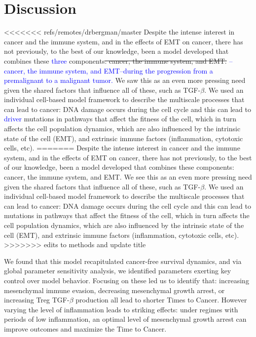 \documentclass[11pt]{article}
\newcommand{\tcb} { \textcolor{blue} }
\begin{document}
\section{Discussion}\label{Discussion}
<<<<<<< refs/remotes/drbergman/master
Despite the intense interest in cancer and the immune system, and in the effects of EMT on cancer, there has not previously, to the best of our knowledge, been a model developed that combines these \tcb{three} components\sout{: cancer, the immune system, and EMT.} \tcb{--cancer, the immune system, and EMT--during the progression from a premalignant to a malignant tumor.} We saw this as an even more pressing need given the shared factors that influence all of these, such as TGF-$\beta$. We used an individual cell-based model framework to describe the multiscale processes that can lead to cancer: DNA damage occurs during the cell cycle and this can lead to \tcb{driver} mutations in pathways that affect the fitness of the cell, which in turn affects the cell population dynamics, which are also influenced by the intrinsic state of the cell (EMT), and extrinsic immune factors (inflammation, cytotoxic cells, etc).
=======
Despite the intense interest in cancer and the immune system, and in the effects of EMT on cancer, there has not previously, to the best of our knowledge, been a model developed that combines these components: cancer, the immune system, and EMT. We see this as an even more pressing need given the shared factors that influence all of these, such as TGF-$\beta$. We used an individual cell-based model framework to describe the multiscale processes that can lead to cancer: DNA damage occurs during the cell cycle and this can lead to mutations in pathways that affect the fitness of the cell, which in turn affects the cell population dynamics, which are also influenced by the intrinsic state of the cell (EMT), and extrinsic immune factors (inflammation, cytotoxic cells, etc).
>>>>>>> edits to methods and update title
\par
We found that this model recapitulated cancer-free survival dynamics, and via global parameter sensitivity analysis, we identified parameters exerting key control over model behavior. Focusing on these led us to identify that: increasing mesenchymal immune evasion, decreasing mesenchymal growth arrest, or increasing Treg TGF-$\beta$ production all lead to shorter Times to Cancer. However varying the level of inflammation leads to striking effects: under regimes with periods of low inflammation, an optimal level of mesenchymal growth arrest can improve outcomes and maximize the Time to Cancer.
\end{document}

